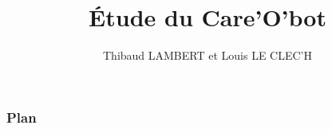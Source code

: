 \documentclass[handout]{beamer}
\title[Care'O'bot ~~~~~~~~ \insertframenumber/\inserttotalframenumber]{\'Etude du Care'O'bot}
\author{Thibaud LAMBERT et Louis LE CLEC'H}
\institute{ENSEIRB-MATMECA}
\begin{document}
	\begin{frame}
		\titlepage
	\end{frame}

	\begin{frame}
		\frametitle{Plan}
		\tableofcontents[hideallsubsections]
	\end{frame}

	
	
	
	
	
\end{document}
